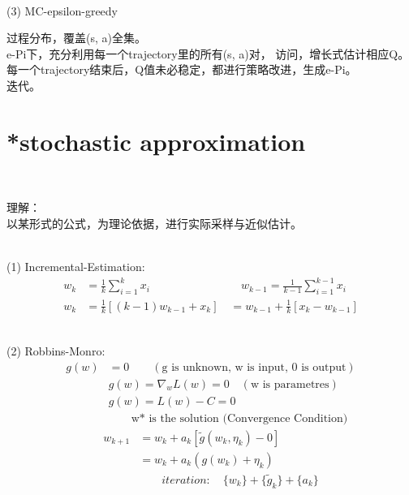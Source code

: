 \documentclass{article}
\begin{document}
~ \\[3pt]
(3) MC-epsilon-greedy 
~ \\[3pt]
\begin{CJK}{UTF8}{gbsn}
    过程分布，覆盖(s, a)全集。 \\[3pt]
    e-Pi下，充分利用每一个trajectory里的所有(s, a)对，
    访问，增长式估计相应Q。 \\[3pt]
    每一个trajectory结束后，Q值未必稳定，都进行策略改进，生成e-Pi。 \\[3pt]
    迭代。 \\[3pt]
\end{CJK}


\newpage
\section*{*stochastic approximation}


~ \\[3pt]
\begin{CJK}{UTF8}{gbsn}
    理解： \\[3pt]
    以某形式的公式，为理论依据，进行实际采样与近似估计。 \\[3pt]
\end{CJK}


~ \\[3pt]
(1) Incremental-Estimation: 
\begin{align*}
    w_{k}   &= \frac {1} {k} \sum_{i=1}^{k} x_{i} 
            \qquad \qquad \qquad \qquad 
    w_{k-1}  = \frac {1} {k-1} \sum_{i=1}^{k-1} x_{i} \\[3pt]
    w_{k}   &= \frac {1} {k} \left[ (k-1)w_{k-1} + x_{k} \right] 
            \quad = w_{k-1} + \frac {1} {k} 
            \left[ x_{k} - w_{k-1} \right] 
\end{align*}


~ \\[3pt]
(2) Robbins-Monro: 
\begin{align*}
    g(w) 
    & = 0 \qquad (\text{g is unknown, w is input, 0 is output}) \\[3pt]
    & g(w) = \nabla_{w} L(w) = 0 \quad (\text{w is parametres}) \\[3pt]
    & g(w) = L(w) - C = 0 \\[3pt]
    & \qquad \text{w* is the solution (Convergence Condition)}
\end{align*}
\begin{align*}
    w_{k+1} &= w_{k} + a_{k} \left[ 
            \tilde{g} \left( w_{k}, \eta_{k} \right) - 0 \right] \\[3pt]
            &= w_{k} + a_{k} 
            \left( g(w_{k}) + \eta_{k} \right) \\[3pt]
            & \qquad iteration: \quad 
            \{w_{k}\} + \{\tilde{g}_{k}\} + \{a_{k}\} 
\end{align*}
\end{document}
